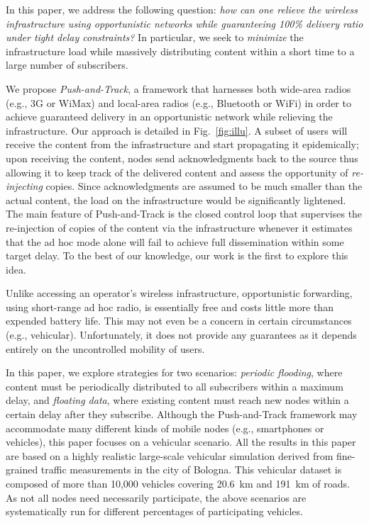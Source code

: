 \documentclass[preprint]{elsarticle}
\begin{document}
In this paper, we address the following question: \textit{how can one relieve the wireless infrastructure using opportunistic networks while guaranteeing 100\% delivery ratio under tight delay constraints?} In particular, we seek to \textit{minimize} the infrastructure load while massively distributing content within a short time to a large number of subscribers. 

We propose \textit{Push-and-Track}, a framework that harnesses both wide-area radios (e.g., 3G or WiMax) and local-area radios (e.g., Bluetooth or WiFi) in order to achieve guaranteed delivery in an opportunistic network while relieving the infrastructure. Our approach is detailed in Fig.~\ref{fig:illu}. A subset of users will receive the content from the infrastructure and start propagating it epidemically; upon receiving the content, nodes send acknowledgments back to the source thus allowing it to keep track of the delivered content and assess the opportunity of \textit{re-injecting} copies. Since acknowledgments are assumed to be much smaller than the actual content, the load on the infrastructure would be significantly lightened. The main feature of Push-and-Track is the closed control loop that supervises the re-injection of copies of the content via the infrastructure whenever it estimates that the ad hoc mode alone will fail to achieve full dissemination within some target delay. To the best of our knowledge, our work is the first to explore this idea.

Unlike accessing an operator's wireless infrastructure, opportunistic forwarding, using short-range ad hoc radio, is essentially free and costs little more than expended battery life. This may not even be a concern in certain circumstances (e.g., vehicular). Unfortunately, it does not provide any guarantees as it depends entirely on the uncontrolled mobility of users.

In this paper, we explore strategies for two scenarios: \textit{periodic flooding}, where content must be periodically distributed to all subscribers within a maximum delay, and \textit{floating data}, where existing content must reach new nodes within a certain delay after they subscribe. Although the Push-and-Track framework may accommodate many different kinds of mobile nodes (e.g., smartphones or vehicles), this paper focuses on a vehicular scenario. All the results in this paper are based on a highly realistic large-scale vehicular simulation derived from fine-grained traffic measurements in the city of Bologna. This vehicular dataset is composed of more than 10,000 vehicles covering 20.6~km and 191~km of roads. As not all nodes need necessarily participate, the above scenarios are systematically run for different percentages of participating vehicles.
\end{document}

